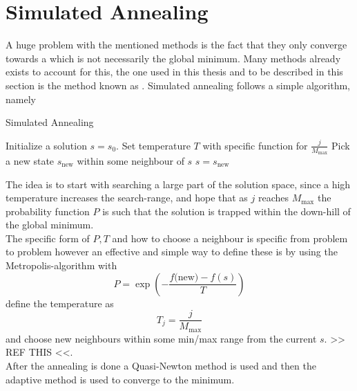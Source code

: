 \section{Simulated Annealing\label{sec:simulated_annealing}}
    A huge problem with the mentioned methods is the fact that they only
    converge towards a  which is not necessarily the
    global minimum. Many methods already exists to account for this, the one
    used in this thesis and to be described in this section is the method known
    as . Simulated annealing follows a simple
    algorithm, namely
        \begin{algorithm}[H]
            \caption{Simulated Annealing\label{alg:simulated_annealing}}
            \begin{algorithmic}[H]
                \State Initialize a solution $s=s_0$. 
                    \State Set temperature $T$ with specific function for
                    $\frac{j}{M_{\text{max}}}$
                    \State Pick a new state $s_{\text{new}}$ within some
                    neighbour of $s$
                        \State $s = s_{\text{new}}$
                    \EndIf
                \EndFor
            \end{algorithmic}
        \end{algorithm}
    The idea is to start with searching a large part of the solution space,
    since a high temperature increases the search-range, and hope that as $j$
    reaches $M_{\text{max}}$ the probability function $P$ is such that the
    solution is trapped within the down-hill of the global minimum. \\ 
    The specific form of $P, T$ and how to choose a neighbour is specific from
    problem to problem however an effective and simple way to define these is
    by using the Metropolis-algorithm with
        \begin{equation}
            P = \exp(-\frac{f({\text{new}) - f(s)}}{T})
        \end{equation}
    define the temperature as
        \begin{equation}
            T_j = \frac{j}{M_{\text{max}}}
        \end{equation}
    and choose new neighbours within some min/max range from the current $s$.
    >> REF THIS <<. \\
    After the annealing is done a Quasi-Newton method is used and then the
    adaptive method is used to converge to the minimum.
